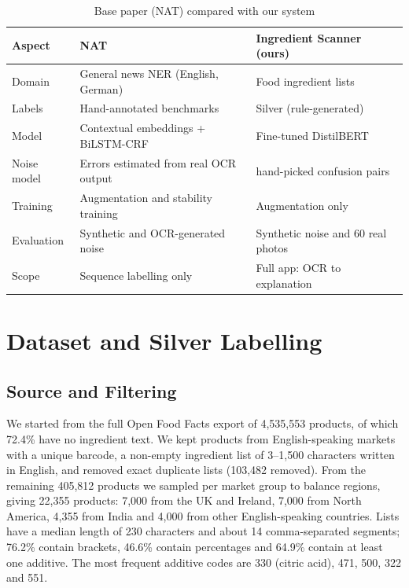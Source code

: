 \documentclass[conference]{IEEEtran}
\begin{document}
\begin{table}[t]
\caption{Base paper (NAT) compared with our system}
\label{tab:comparison}
\centering
\footnotesize
\setlength{\tabcolsep}{3pt}
\begin{tabular}{>{\raggedright\arraybackslash}p{1.45cm}>{\raggedright\arraybackslash}p{3.1cm}>{\raggedright\arraybackslash}p{3.1cm}}
\toprule
Aspect & NAT~\cite{namysl2020nat} & Ingredient Scanner (ours) \\
\midrule
Domain & General news NER (English, German) & Food ingredient lists \\
Labels & Hand-annotated benchmarks & Silver (rule-generated) \\
Model & Contextual embeddings + BiLSTM-CRF & Fine-tuned DistilBERT \\
Noise model & Errors estimated from real OCR output & 13 hand-picked confusion pairs \\
Training & Augmentation and stability training & Augmentation only \\
Evaluation & Synthetic and OCR-generated noise & Synthetic noise and 60 real photos \\
Scope & Sequence labelling only & Full app: OCR to explanation \\
\bottomrule
\end{tabular}
\end{table}

\section{Dataset and Silver Labelling}
\label{sec:dataset}

\subsection{Source and Filtering}
We started from the full Open Food Facts export of 4,535,553 products, of which 72.4\% have no ingredient text. We kept products from English-speaking markets with a unique barcode, a non-empty ingredient list of 3--1,500 characters written in English, and removed exact duplicate lists (103,482 removed). From the remaining 405,812 products we sampled per market group to balance regions, giving 22,355 products: 7,000 from the UK and Ireland, 7,000 from North America, 4,355 from India and 4,000 from other English-speaking countries. Lists have a median length of 230 characters and about 14 comma-separated segments; 76.2\% contain brackets, 46.6\% contain percentages and 64.9\% contain at least one additive. The most frequent additive codes are 330 (citric acid), 471, 500, 322 and 551.
\end{document}
